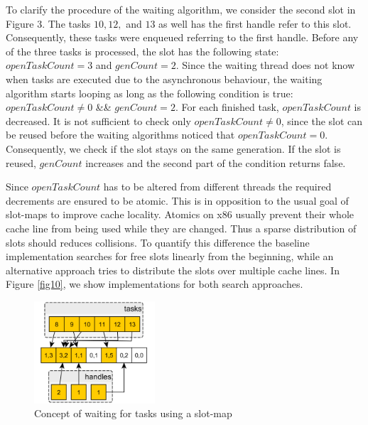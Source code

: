 \documentclass[conference]{IEEEtran}
\begin{document}
To clarify the procedure of the waiting algorithm, we consider the second slot in Figure 3. The tasks $10, 12, $ and $13$ as well has the first handle refer to this slot. Consequently, these tasks were enqueued referring to the first handle. Before any of the three tasks is processed, the slot has the following state: $openTaskCount = 3$ and $genCount =  2$. Since the waiting thread does not know when tasks are executed due to the asynchronous behaviour, the waiting algorithm starts looping as long as the following condition is true: $openTaskCount \neq 0$ \&\& $genCount = 2$. For each finished task, $openTaskCount$ is decreased. It is not sufficient to check only $openTaskCount \neq 0$, since the slot can be reused before the waiting algorithms noticed that $openTaskCount = 0$. Consequently, we check if the slot stays on the same generation. If the slot is reused, $genCount$ increases and the second part of the condition returns false.

Since $openTaskCount$ has to be altered from different threads the required decrements are ensured to be atomic. This is in opposition to the usual goal of slot-maps to improve cache locality. Atomics on x86 usually prevent their whole cache line from being used while they are changed. Thus a sparse distribution of slots should reduces collisions. To quantify this difference the baseline implementation searches for free slots linearly from the beginning, while an alternative approach tries to distribute the slots over multiple cache lines. In Figure \ref{fig10}, we show implementations for both search approaches.

\begin{figure}
	\includegraphics[width=0.4\textwidth]{img/waitingconcept.png}
	\caption{Concept of waiting for tasks using a slot-map}
	\label{fig2}
\end{figure}
\end{document}
